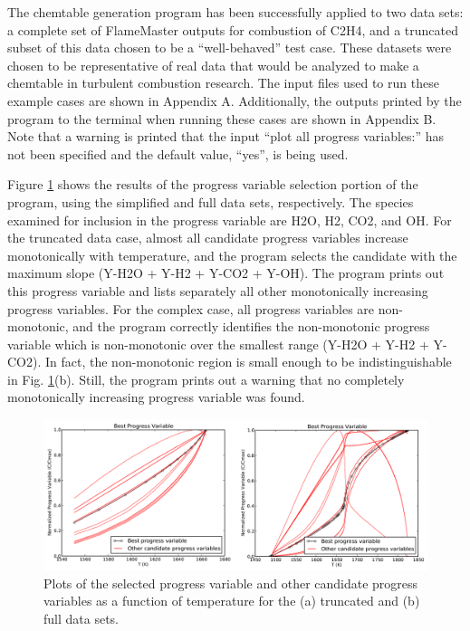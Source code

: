 \documentclass[11pt]{article}
\begin{document}
The chemtable generation program has been successfully applied to two
data sets: a complete set of FlameMaster outputs for combustion of
C2H4, and a truncated subset of this data chosen to be a
“well-behaved” test case. These datasets were chosen to be
representative of real data that would be analyzed to make a chemtable
in turbulent combustion research. The input files used to run these
example cases are shown in Appendix A. Additionally, the outputs
printed by the program to the terminal when running these cases are
shown in Appendix B. Note that a warning is printed that the input
“plot all progress variables:” has not been specified and the default
value, “yes”, is being used.

Figure \ref{fig:xa_xb} shows the results of the progress variable
selection portion of the program, using the simplified and full data
sets, respectively. The species examined for inclusion in the progress
variable are H2O, H2, CO2, and OH. For the truncated data case, almost
all candidate progress variables increase monotonically with
temperature, and the program selects the candidate with the maximum
slope (Y-H2O + Y-H2 + Y-CO2 + Y-OH). The program prints out this
progress variable and lists separately all other monotonically
increasing progress variables. For the complex case, all progress
variables are non-monotonic, and the program correctly identifies the
non-monotonic progress variable which is non-monotonic over the
smallest range (Y-H2O + Y-H2 + Y-CO2). In fact, the non-monotonic
region is small enough to be indistinguishable in
Fig. \ref{fig:xa_xb}(b). Still, the program prints out a warning that
no completely monotonically increasing progress variable was found.

\begin{figure} [h]
\centering
\includegraphics[width=\textwidth]{xa_xb}
\caption{\label{fig:xa_xb} Plots of the selected progress variable and
  other candidate progress variables as a function of temperature for
  the (a) truncated and (b) full data sets.  }
\end{figure}
\end{document}
